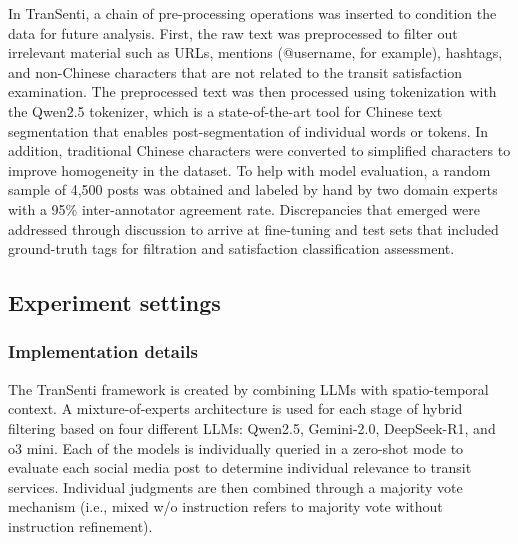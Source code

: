 \documentclass[a4paper,fleqn,12pt]{cas-sc}
\begin{document}
In TranSenti, a chain of pre-processing operations was inserted to condition the data for future analysis. First, the raw text was preprocessed to filter out irrelevant material such as URLs, mentions (@username, for example), hashtags, and non-Chinese characters that are not related to the transit satisfaction examination. The preprocessed text was then processed using tokenization with the Qwen2.5 tokenizer, which is a state-of-the-art tool for Chinese text segmentation that enables post-segmentation of individual words or tokens. In addition, traditional Chinese characters were converted to simplified characters to improve homogeneity in the dataset. To help with model evaluation, a random sample of 4,500 posts was obtained and labeled by hand by two domain experts with a 95\% inter-annotator agreement rate. Discrepancies that emerged were addressed through discussion to arrive at fine-tuning and test sets that included ground-truth tags for filtration and satisfaction classification assessment.

\subsection{Experiment settings}
\subsubsection{Implementation details}
The TranSenti framework is created by combining LLMs with spatio-temporal context. A mixture-of-experts architecture is used for each stage of hybrid filtering based on four different LLMs: Qwen2.5, Gemini-2.0, DeepSeek-R1, and o3 mini. Each of the models is individually queried in a zero-shot mode to evaluate each social media post to determine individual relevance to transit services. Individual judgments are then combined through a majority vote mechanism (i.e., mixed w/o instruction refers to majority vote without instruction refinement).
\end{document}
